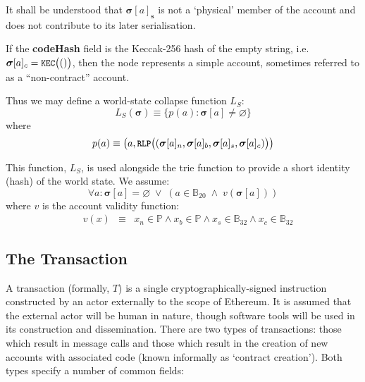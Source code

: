 \documentclass[9pt,oneside]{amsart}
\begin{document}
\begin{multicols}{2}
It shall be understood that $\boldsymbol{\sigma}[a]_\mathbf{s}$ is not a `physical' member of the account and does not contribute to its later serialisation.

If the \textbf{codeHash} field is the Keccak-256 hash of the empty string, i.e. $\boldsymbol{\sigma}[a]_c = \texttt{\small KEC}\big(()\big)$, then the node represents a simple account, sometimes referred to as a ``non-contract'' account.

Thus we may define a world-state collapse function $L_S$:
\begin{equation}
L_S(\boldsymbol{\sigma}) \equiv \{ p(a): \boldsymbol{\sigma}[a] \neq \varnothing \}
\end{equation}
where
\begin{equation}
p(a) \equiv  \big(a, \texttt{\small RLP}\big( (\boldsymbol{\sigma}[a]_n, \boldsymbol{\sigma}[a]_b, \boldsymbol{\sigma}[a]_s, \boldsymbol{\sigma}[a]_c) \big) \big)
\end{equation}

This function, $L_S$, is used alongside the trie function to provide a short identity (hash) of the world state. We assume:
\begin{equation}
\forall a: \boldsymbol{\sigma}[a] = \varnothing \; \vee \; (a \in \mathbb{B}_{20} \; \wedge \; v(\boldsymbol{\sigma}[a]))
\end{equation}
where $v$ is the account validity function:
\begin{eqnarray}
\quad v(x) & \equiv & x_n \in \mathbb{P} \wedge x_b \in \mathbb{P} \wedge x_s \in \mathbb{B}_{32} \wedge x_c \in \mathbb{B}_{32}
\end{eqnarray}

\subsection{The Transaction} \label{ch:transaction}

A transaction (formally, $T$) is a single cryptographically-signed instruction constructed by an actor externally to the scope of Ethereum. It is assumed that the external actor will be human in nature, though software tools will be used in its construction and dissemination. There are two types of transactions: those which result in message calls and those which result in the creation of new accounts with associated code (known informally as `contract creation'). Both types specify a number of common fields:


\end{multicols}
\end{document}
